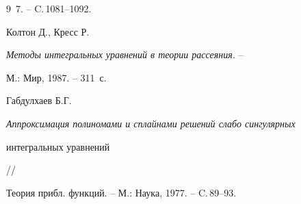\begin{thebibliography}{9}
\No\,7. -- C.\,1081--1092.




Колтон Д., Кресс Р.


{\it Методы интегральных уравнений в теории рассеяния.} --


М.: Мир, 1987. -- 311~с.




Габдулхаев Б.Г.


{\it Аппроксимация полиномами и сплайнами решений слабо сингулярных


интегральных уравнений} //


Теория прибл. функций. -- М.: Наука, 1977. -- C.\,89--93.





\end{thebibliography}





\vskip 2cm












\label{end}






